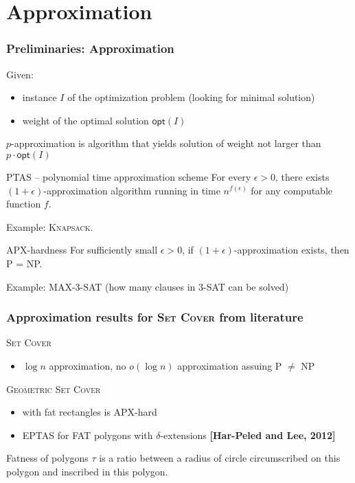 \documentclass{beamer}
\begin{document}
\section{Approximation}
\begin{frame}
\frametitle{Preliminaries: Approximation}
Given:
\begin{itemize}
\item instance $I$ of the optimization problem (looking for minimal solution)
\item weight of the optimal solution $\mathsf{opt}(I)$
\end{itemize}
$p$-approximation is algorithm that yields solution of weight not larger than
$p\cdot \mathsf{opt}(I)$
\begin{block}{PTAS -- polynomial time approximation scheme}
For every $\epsilon > 0$, there exists $(1+\epsilon)$-approximation
algorithm running in time $n^{f(\epsilon)}$ for any computable function $f$.

Example: \textsc{Knapsack}.

\end{block}

\begin{block}{APX-hardness}
For sufficiently small $\epsilon > 0$,
if $(1+\epsilon)$-approximation exists, then P = NP.

Example: \textsc{MAX-3-SAT} (how many clauses in 3-SAT can be solved)
\end{block}


\end{frame}
\begin{frame}
\frametitle{Approximation results for \textsc{Set Cover} from literature}
\textsc{Set Cover}
\begin{itemize}
\item $\log n$ approximation, no $o(\log n)$ approximation assuing P $\neq$ NP
\end{itemize}

\textsc{Geometric Set Cover}
\begin{itemize}
\item with fat rectangles is APX-hard
\item EPTAS for FAT polygons with $\delta$-extensions \textbf{[Har-Peled and Lee, 2012]}
\end{itemize}


\begin{definition}{
Fatness of polygons $\tau$ is a ratio between a radius of circle
circumscribed on this polygon and inscribed in this polygon.
}\end{definition}


\end{frame}
\end{document}
